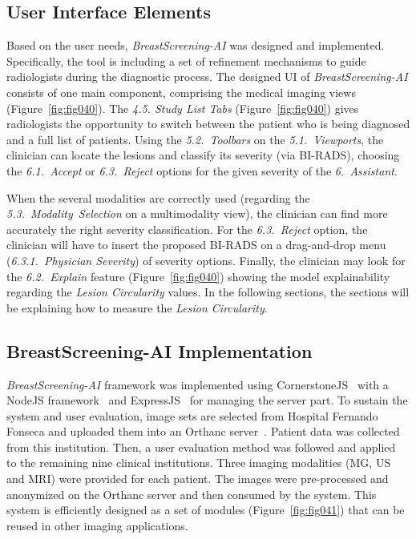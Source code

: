 \subsection{User Interface Elements}
\label{sec:app002003002}

Based on the user needs, {\it BreastScreening-AI} was designed and implemented.
Specifically, the tool is including a set of refinement mechanisms to guide radiologists during the diagnostic process.
The designed \ac{UI} of {\it BreastScreening-AI} consists of one main component, comprising the medical imaging views (Figure~\ref{fig:fig040}).
The {\it 4.5. Study List Tabs} (Figure~\ref{fig:fig040}) gives radiologists the opportunity to switch between the patient who is being diagnosed and a full list of patients.
Using the {\it 5.2.~Toolbars} on the {\it 5.1.~Viewports}, the clinician can locate the lesions and classify its severity (via \ac{BI-RADS}), choosing the {\it 6.1.~Accept} or {\it 6.3.~Reject} options for the given severity of the {\it 6.~Assistant}.

When the several modalities are correctly used (regarding the {\it 5.3.~Modality~Selection} on a multimodality view), the clinician can find more accurately the right severity classification.
For the {\it 6.3.~Reject} option, the clinician will have to insert the proposed \ac{BI-RADS} on a drag-and-drop menu ({\it 6.3.1.~Physician Severity}) of severity options.
Finally, the clinician may look for the {\it 6.2.~Explain} feature (Figure~\ref{fig:fig040}) showing the model explainability regarding the {\it Lesion Circularity} values.
In the following sections, the sections will be explaining how to measure the {\it Lesion Circularity}.

\subsection{BreastScreening-AI Implementation}
\label{sec:app002003003}

{\it BreastScreening-AI} framework was implemented using CornerstoneJS\footnotemark[36]~\cite{urban2017lesiontracker} with a NodeJS framework\footnotemark[37]~\cite{farrell2016nodejs, drnasin2017javascript} and ExpressJS\footnotemark[38]~\cite{gustin2017empowerment} for managing the server part.
To sustain the system and user evaluation, image sets are selected from Hospital Fernando Fonseca and uploaded them into an Orthanc server~\cite{Jodogne2018}.
Patient data was collected from this institution.
Then, a user evaluation method was followed and applied~\cite{https://doi.org/10.13140/rg.2.2.16566.14403/1} to the remaining nine clinical institutions.
Three imaging modalities (\ac{MG}, \ac{US} and \ac{MRI}) were provided for each patient.
The images were pre-processed and anonymized on the Orthanc server and then consumed by the system.
This system is efficiently designed as a set of modules (Figure~\ref{fig:fig041}) that can be reused in other imaging applications.

